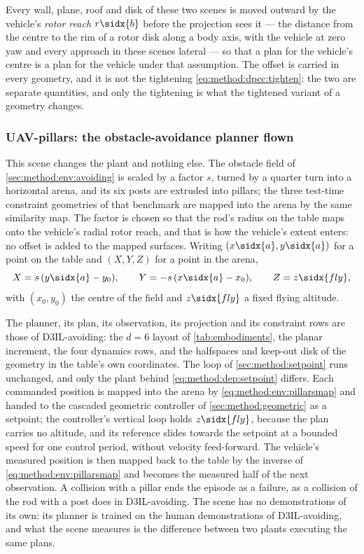 Every wall, plane, roof and disk of these two scenes is moved outward by the vehicle's \emph{rotor
reach} $r\sidx{b}$ before the projection sees it --- the distance from the centre to the rim of a rotor
disk along a body axis, with the vehicle at zero yaw and every approach in these scenes lateral --- so
that a plan for the vehicle's centre is a plan for the vehicle under that assumption. The offset is
carried in every geometry, and it is not the tightening \eqref{eq:method:dpcc:tighten}: the two are
separate quantities, and only the tightening is what the tightened variant of a geometry changes.

\subsubsection*{UAV-pillars: the obstacle-avoidance planner flown}

This scene changes the plant and nothing else. The obstacle field of \autoref{sec:method:env:avoiding}
is scaled by a factor $s$, turned by a quarter turn into a horizontal arena, and its six posts are
extruded into pillars; the three test-time constraint geometries of that benchmark are mapped into the
arena by the same similarity map. The factor is chosen so that the rod's radius on the table maps onto
the vehicle's radial rotor reach, and that is how the vehicle's extent enters: no offset is added to the
mapped surfaces. Writing $(x\sidx{a},y\sidx{a})$ for a point on the table and $(X,Y,Z)$ for a point in
the arena,
\begin{equation}\label{eq:method:env:pillarsmap}
  X = s\,(y\sidx{a}-y_{0}),
  \qquad
  Y = -s\,(x\sidx{a}-x_{0}),
  \qquad
  Z = z\sidx{fly},
\end{equation}
with $(x_{0},y_{0})$ the centre of the field and $z\sidx{fly}$ a fixed flying altitude.

The planner, its plan, its observation, its projection and its constraint rows are those of D3IL-avoiding:
the $d = 6$ layout of \autoref{tab:embodiments}, the planar increment, the four dynamics rows, and the
halfspaces and keep-out disk of the geometry in the table's own coordinates. The loop of
\autoref{sec:method:setpoint} runs unchanged, and only the plant behind \eqref{eq:method:dep:setpoint}
differs. Each commanded position is mapped into the arena by \eqref{eq:method:env:pillarsmap} and handed
to the cascaded geometric controller of \autoref{sec:method:geometric} as a setpoint; the controller's
vertical loop holds $z\sidx{fly}$, because the plan carries no altitude, and its reference slides towards
the setpoint at a bounded speed for one control period, without velocity feed-forward. The vehicle's
measured position is then mapped back to the table by the inverse of \eqref{eq:method:env:pillarsmap}
and becomes the measured half of the next observation. A collision with a pillar ends the episode as a
failure, as a collision of the rod with a post does in D3IL-avoiding. The scene has no demonstrations of its own:
its planner is trained on the human demonstrations of D3IL-avoiding, and what the scene measures is the
difference between two plants executing the same plans.

